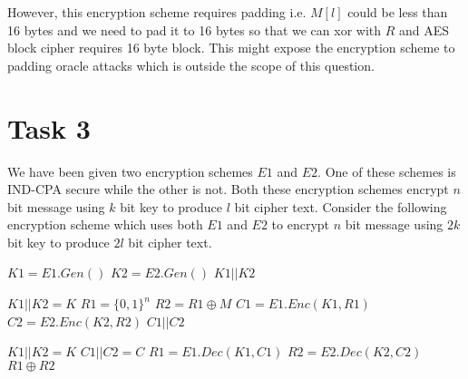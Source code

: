 \documentclass{article}
\begin{document}
    However, this encryption scheme requires padding i.e. $M[l]$ could be less than 16 bytes and we need to pad it to 16 bytes so that we can xor with $R$ and AES block cipher requires 16 byte block. This might expose the encryption scheme to padding oracle attacks which is outside the scope of this question.

    \section*{Task 3}
    We have been given two encryption schemes $E1$ and $E2$. One of these schemes is IND-CPA secure while the other is not. Both these encryption schemes encrypt $n$ bit message using $k$ bit key to produce $l$ bit cipher text. Consider the following encryption scheme which uses both $E1$ and $E2$ to encrypt $n$ bit message using $2k$ bit key to produce $2l$ bit cipher text.

    \begin{algorithm}[H]
        \begin{algorithmic}
                \State $K1 = E1.Gen()$
                \State $K2 = E2.Gen()$
                \State \Return $K1 || K2$
            \EndProcedure
        \end{algorithmic}
    \end{algorithm}

    \begin{algorithm}[H]
        \begin{algorithmic}
                \State $K1 || K2 = K$
                \State $R1 = \{0, 1\}^n$
                \State $R2 = R1 \oplus M$
                \State $C1 = E1.Enc(K1, R1)$
                \State $C2 = E2.Enc(K2, R2)$
                \State \Return $C1 || C2$
            \EndProcedure
        \end{algorithmic}
    \end{algorithm}

    \begin{algorithm}[H]
        \begin{algorithmic}
                \State $K1 || K2 = K$
                \State $C1 || C2 = C$
                \State $R1 = E1.Dec(K1, C1)$
                \State $R2 = E2.Dec(K2, C2)$
                \State \Return $R1 \oplus R2$
            \EndProcedure
        \end{algorithmic}
    \end{algorithm}
\end{document}
